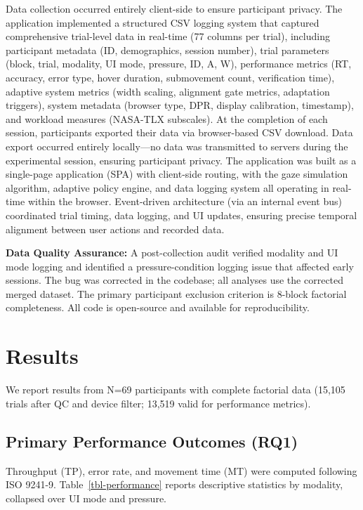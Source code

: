 \documentclass[
  11pt,
  11pt,
  letterpaper]{article}
\begin{document}
Data collection occurred entirely client-side to ensure participant
privacy. The application implemented a structured CSV logging system
that captured comprehensive trial-level data in real-time (77 columns
per trial), including participant metadata (ID, demographics, session
number), trial parameters (block, trial, modality, UI mode, pressure,
ID, A, W), performance metrics (RT, accuracy, error type, hover
duration, submovement count, verification time), adaptive system metrics
(width scaling, alignment gate metrics, adaptation triggers), system
metadata (browser type, DPR, display calibration, timestamp), and
workload measures (NASA-TLX subscales). At the completion of each
session, participants exported their data via browser-based CSV
download. Data export occurred entirely locally---no data was
transmitted to servers during the experimental session, ensuring
participant privacy. The application was built as a single-page
application (SPA) with client-side routing, with the gaze simulation
algorithm, adaptive policy engine, and data logging system all operating
in real-time within the browser. Event-driven architecture (via an
internal event bus) coordinated trial timing, data logging, and UI
updates, ensuring precise temporal alignment between user actions and
recorded data.

\textbf{Data Quality Assurance:} A post-collection audit verified
modality and UI mode logging and identified a pressure-condition logging
issue that affected early sessions. The bug was corrected in the
codebase; all analyses use the corrected merged dataset. The primary
participant exclusion criterion is 8-block factorial completeness. All
code is open-source and available for reproducibility.

\section{Results}\label{results}

We report results from N=69 participants with complete factorial data
(15,105 trials after QC and device filter; 13,519 valid for performance
metrics).

\subsection{Primary Performance Outcomes
(RQ1)}\label{primary-performance-outcomes-rq1}

Throughput (TP), error rate, and movement time (MT) were computed
following ISO 9241-9. Table~\ref{tbl-performance} reports descriptive
statistics by modality, collapsed over UI mode and pressure.
\end{document}
